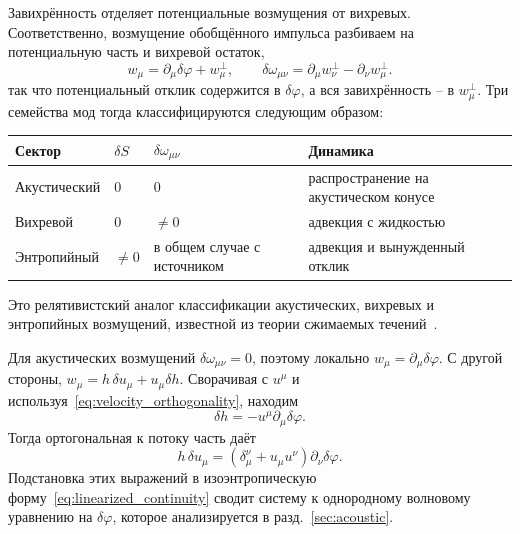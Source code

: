 \documentclass[12pt,a4paper,preprint,nopreprintline]{elsarticle}
\begin{document}
Завихрённость отделяет потенциальные возмущения от вихревых. Соответственно, возмущение обобщённого импульса разбиваем на потенциальную часть и вихревой остаток,
\begin{equation}
    w_{\mu}
    =
    \partial_{\mu}\delta\varphi+w_{\mu}^{\perp},
    \qquad
    \delta\omega_{\mu\nu}
    =
    \partial_{\mu}w_{\nu}^{\perp}
    -
    \partial_{\nu}w_{\mu}^{\perp}.
    \label{eq:helmholtz_decomposition}
\end{equation}
так что потенциальный отклик содержится в $\delta\varphi$, а вся завихрённость -- в $w_{\mu}^{\perp}$. Три семейства мод тогда классифицируются следующим образом:
\begin{center}
    \small
    \setlength{\tabcolsep}{4pt}
    \renewcommand{\arraystretch}{1.1}
    \begin{tabularx}{\textwidth}{
        >{\raggedright\arraybackslash}p{3.0cm}
        >{\centering\arraybackslash}p{1.2cm}
        >{\centering\arraybackslash}p{3.8cm}
        >{\raggedright\arraybackslash}X}
        \toprule
        Сектор & $\delta S$ & $\delta\omega_{\mu\nu}$ & Динамика \\
        \midrule
        Акустический & $0$ & $0$ & распространение на акустическом конусе \\
        Вихревой & $0$ & $\neq0$ & адвекция с жидкостью \\
        Энтропийный & $\neq0$ & в общем случае с источником & адвекция и вынужденный отклик \\
        \bottomrule
    \end{tabularx}
\end{center}
Это релятивистский аналог классификации акустических, вихревых и энтропийных возмущений, известной из теории сжимаемых течений~\cite{KovasznayLSG_TurbulenceInSupersonicFlow_1953}.

Для акустических возмущений $\delta\omega_{\mu\nu}=0$, поэтому локально $w_{\mu}=\partial_{\mu}\delta\varphi$. С другой стороны, $w_{\mu}=h\,\delta u_{\mu}+u_{\mu}\delta h$. Сворачивая с $u^{\mu}$ и используя~\eqref{eq:velocity_orthogonality}, находим
\begin{equation}
    \delta h=-u^{\mu}\partial_{\mu}\delta\varphi.
    \label{eq:acoustic_enthalpy}
\end{equation}
Тогда ортогональная к потоку часть даёт
\begin{equation}
    h\,\delta u_{\mu}
    =
    \left(\delta_{\mu}^{\nu}+u_{\mu}u^{\nu}\right)
    \partial_{\nu}\delta\varphi.
    \label{eq:acoustic_fields}
\end{equation}
Подстановка этих выражений в изоэнтропическую форму~\eqref{eq:linearized_continuity} сводит систему к однородному волновому уравнению на $\delta\varphi$, которое анализируется в разд.~\ref{sec:acoustic}.
\end{document}

